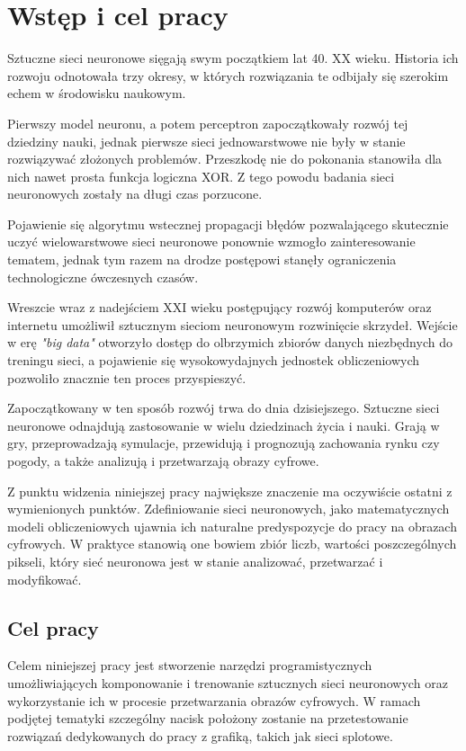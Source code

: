 \section{Wstęp i cel pracy}
  Sztuczne sieci neuronowe sięgają swym początkiem lat 40. XX wieku.
  Historia ich rozwoju odnotowała trzy okresy, w których rozwiązania te
  odbijały się szerokim echem w środowisku naukowym.

  Pierwszy model neuronu, a potem perceptron zapoczątkowały
  rozwój tej dziedziny nauki, jednak pierwsze sieci jednowarstwowe nie były w
  stanie rozwiązywać złożonych problemów. Przeszkodę nie do pokonania stanowiła
  dla nich nawet prosta funkcja logiczna XOR. Z tego powodu badania sieci
  neuronowych zostały na długi czas porzucone.

  Pojawienie się algorytmu wstecznej propagacji błędów
  pozwalającego skutecznie uczyć wielowarstwowe sieci neuronowe ponownie
  wzmogło zainteresowanie tematem, jednak tym razem na drodze postępowi stanęły
  ograniczenia technologiczne ówczesnych czasów.

  Wreszcie wraz z nadejściem XXI wieku postępujący rozwój
  komputerów oraz internetu umożliwił sztucznym sieciom neuronowym rozwinięcie
  skrzydeł. Wejście w erę \textit{"big data"} otworzyło dostęp do olbrzymich zbiorów
  danych niezbędnych do treningu sieci, a pojawienie się wysokowydajnych
  jednostek obliczeniowych pozwoliło znacznie ten proces przyspieszyć.

  Zapoczątkowany w ten sposób rozwój trwa do dnia dzisiejszego.
  Sztuczne sieci neuronowe odnajdują zastosowanie w wielu dziedzinach życia i
  nauki. Grają w gry, przeprowadzają symulacje, przewidują i prognozują
  zachowania rynku czy pogody, a także analizują i przetwarzają obrazy cyfrowe.

  Z punktu widzenia niniejszej pracy największe znaczenie ma
  oczywiście ostatni z wymienionych punktów. Zdefiniowanie sieci neuronowych,
  jako matematycznych modeli obliczeniowych ujawnia ich naturalne predyspozycje
  do pracy na obrazach cyfrowych. W praktyce stanowią one bowiem zbiór liczb,
  wartości poszczególnych pikseli, który sieć neuronowa jest w stanie
  analizować, przetwarzać i modyfikować.

  \subsection{Cel pracy}
    Celem niniejszej pracy jest stworzenie narzędzi programistycznych umożliwiających
    komponowanie i trenowanie sztucznych sieci neuronowych oraz wykorzystanie ich w procesie przetwarzania
    obrazów cyfrowych. W ramach podjętej tematyki szczególny nacisk położony
    zostanie na przetestowanie rozwiązań dedykowanych do pracy z grafiką, takich jak
    sieci splotowe.

